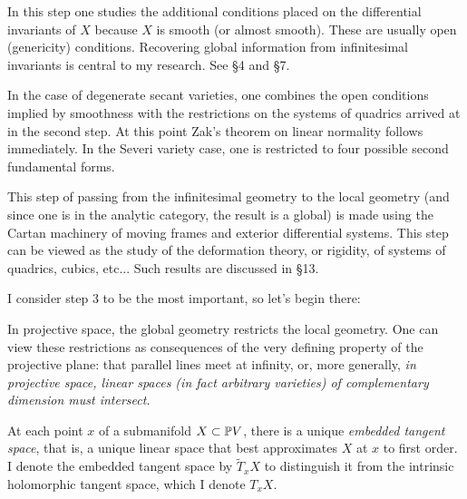 \smallpagebreak




In this step one studies the   additional conditions  
placed on the differential invariants
of $X$  because $X$ is   smooth (or almost smooth).
These are usually open (genericity) conditions.
Recovering global information
from  infinitesimal
invariants is   central to my research. See \S 4 and \S 7.


 
\smallpagebreak




In the case of degenerate secant varieties,
  one  combines  the open conditions
implied by smoothness with the
restrictions on the systems of quadrics arrived at in the second step.
At  this point Zak's theorem on linear normality follows immediately.
In the Severi variety case, one is restricted to  four possible
second fundamental forms.


\smallpagebreak



  This step of 
  passing from the infinitesimal geometry to the local geometry
(and since one is in the analytic category, the result is
a global) is made using the Cartan machinery of moving
frames and exterior differential systems.  
This step can be viewed as the
study of the  deformation theory, or rigidity, of   systems of
quadrics, cubics, etc...
Such results are discussed in \S 13.


\medpagebreak

I consider step 3 to be the most important, so let's begin there: 


In projective 
space, 
the global geometry restricts the local geometry.
One can view these restrictions as consequences of    
    the very defining property of the
projective plane:  that parallel lines meet at infinity, or, more
generally,
{\it in projective space, 
  linear spaces
(in fact arbitrary varieties) of complementary dimension  must
intersect.}

At each point $x$ of a submanifold $X\subset
 \Bbb P V$, 
there is a unique {\it embedded tangent space}, that is, a unique
linear space that best approximates $X$ at $x$ to first order.
 I  denote the embedded tangent space by
$\tilde T_xX$   to distinguish it from
the intrinsic holomorphic tangent space, which I denote $T_xX$.

